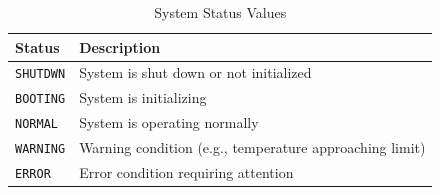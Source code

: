 \begin{table}[htbp]
    \centering
    \caption{System Status Values}
    \label{tab:sys-status}
    \begin{tabular}{lp{10cm}}
        \toprule
        \textbf{Status} & \textbf{Description} \\
        \midrule
        \texttt{SHUTDWN} & System is shut down or not initialized \\
        \texttt{BOOTING} & System is initializing \\
        \texttt{NORMAL} & System is operating normally \\
        \texttt{WARNING} & Warning condition (e.g., temperature approaching limit) \\
        \texttt{ERROR} & Error condition requiring attention \\
        \bottomrule
    \end{tabular}
\end{table}
